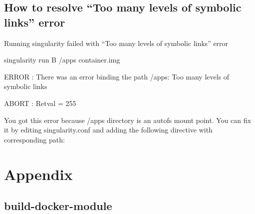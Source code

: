 \documentclass[letterpaper,10pt,english]{sphinxmanual}
\begin{document}
%
\begin{sphinxVerbatim}[commandchars=\\\{\}]
      
\end{sphinxVerbatim}


\section{How to resolve “Too many levels of symbolic links” error}
\label{\detokenize{troubleshooting:how-to-resolve-too-many-levels-of-symbolic-links-error}}
Running singularity failed with “Too many levels of symbolic links”
error

%
\begin{sphinxVerbatim}[commandchars=\\\{\}]
\PYGZdl{} singularity run \PYGZhy{}B /apps container.img

ERROR : There was an error binding the path /apps: Too many levels of symbolic links

ABORT : Retval = 255
\end{sphinxVerbatim}

You got this error because /apps directory is an autofs mount point. You
can fix it by editing singularity.conf and adding the following
directive with corresponding path:

%
\begin{sphinxVerbatim}[commandchars=\\\{\}]
    
\end{sphinxVerbatim}


\chapter{Appendix}
\label{\detokenize{appendix:appendix}}\label{\detokenize{appendix::doc}}

\section{build-docker-module}
\label{\detokenize{appendix:build-docker-module}}
\end{document}
